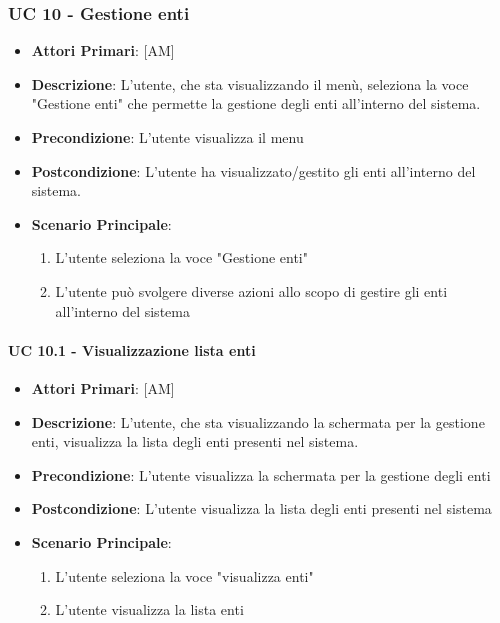 		\subsubsection{UC 10 - Gestione enti}
		\begin{itemize}
			\item \textbf{Attori Primari}: [AM]
			\item \textbf{Descrizione}: L'utente, che sta visualizzando il menù, seleziona la voce "Gestione enti" che permette la gestione degli enti all'interno del sistema.
			\item \textbf{Precondizione}: L'utente visualizza il menu
			\item \textbf{Postcondizione}: L'utente ha visualizzato/gestito gli enti all'interno del sistema. 
			\item \textbf{Scenario Principale}:
			\begin{enumerate}
				\item{L'utente seleziona la voce "Gestione enti"}
				\item{L'utente può svolgere diverse azioni allo scopo di gestire gli enti all'interno del sistema}
			\end{enumerate}	
		\end{itemize}

			\paragraph{UC 10.1 - Visualizzazione lista enti }
			\begin{itemize}
				\item \textbf{Attori Primari}: [AM]
				\item \textbf{Descrizione}: L'utente, che sta visualizzando la schermata per la gestione enti, visualizza la lista degli enti presenti nel sistema.
				\item \textbf{Precondizione}: L'utente visualizza la schermata per la gestione degli enti
				\item \textbf{Postcondizione}: L'utente visualizza la lista degli enti presenti nel sistema
				\item \textbf{Scenario Principale}:
				\begin{enumerate}
					\item{L'utente seleziona la voce "visualizza enti"}
					\item{L'utente visualizza la lista enti}
				\end{enumerate}	
			\end{itemize}

